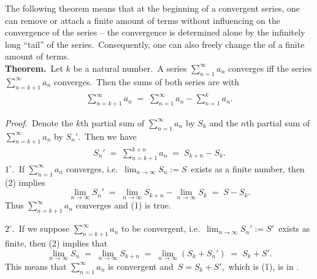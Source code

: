 \documentclass[12pt]{article}
\theoremstyle{definition}
\begin{document}

The following theorem means that at the beginning of a convergent series, one can remove or attach a finite amount of terms without influencing on the convergence of the series -- the convergence is determined alone by the infinitely long ``tail'' of the series.\, Consequently, one can also freely change the  of a finite amount of terms.\\

\textbf{Theorem.}\, Let $k$ be a natural number.\, A series $\displaystyle\sum_{n=1}^\infty a_n$ converges iff
the series $\displaystyle\sum_{n=k+1}^\infty\!a_n$ converges.\, Then the sums of both series are  with
\begin{align}
\sum_{n=k+1}^\infty\!a_n \;=\; \sum_{n=1}^\infty a_n-\sum_{n=1}^k a_n.
\end{align}


\emph{Proof.}\, Denote the $k$th partial sum of $\sum_{n=1}^\infty a_n$ by $S_k$ and the $n$th partial sum of 
$\sum_{n=k+1}^\infty a_n$ by $S_n'$.\, Then we have
\begin{align}
S_n' \;=\; \sum_{n=k+1}^{k+n}\!a_n \;=\; S_{k+n}\!-\!S_k.
\end{align}
$1^\circ$.\, If $\sum_{n=1}^\infty a_n$ converges, i.e.\, $\lim_{n\to\infty}S_n := S$\, exists as a finite number,  then (2) implies
$$\lim_{n\to\infty}S_n' \;=\; \lim_{n\to\infty}S_{k+n}-\lim_{n\to\infty}S_k \;=\; S\!-\!S_k.$$
Thus $\sum_{n=k+1}^\infty a_n$ converges and (1) is true.

$2^\circ$.\, If we suppose $\sum_{n=k+1}^\infty a_n$ to be convergent, i.e.\, $\lim_{n\to\infty}S_n' := S'$\, exists as finite, then (2) implies that
$$\lim_{n\to\infty}S_n \;=\; \lim_{n\to\infty}S_{k+n} \;=\; \lim_{n\to\infty}(S_k+S_n') \;=\; S_k\!+\!S'.$$
This means that $\sum_{n=1}^\infty a_n$ is convergent and\, $S = S_k\!+\!S'$,\, which is (1), is in .


\end{document}
